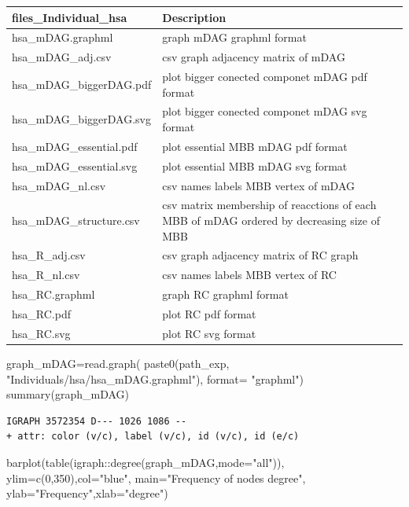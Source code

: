 \documentclass[
  letterpaper,
  DIV=11,
  numbers=noendperiod]{scrreprt}
\newenvironment{Shaded}{}{}
\newcommand{\AttributeTok}[1]{\textcolor[rgb]{0.78,0.47,0.87}{#1}}
\newcommand{\DecValTok}[1]{\textcolor[rgb]{0.82,0.60,0.40}{#1}}
\newcommand{\FunctionTok}[1]{\textcolor[rgb]{0.38,0.69,0.94}{#1}}
\newcommand{\NormalTok}[1]{\textcolor[rgb]{0.67,0.70,0.75}{#1}}
\newcommand{\OtherTok}[1]{\textcolor[rgb]{0.15,0.68,0.38}{#1}}
\newcommand{\SpecialCharTok}[1]{\textcolor[rgb]{0.34,0.71,0.76}{#1}}
\newcommand{\StringTok}[1]{\textcolor[rgb]{0.60,0.76,0.47}{#1}}
\begin{document}
\begin{tabular}{l|l}
\hline
files\_Individual\_hsa & Description\\
\hline
hsa\_mDAG.graphml & graph mDAG graphml format\\
\hline
hsa\_mDAG\_adj.csv & csv graph adjacency matrix of mDAG\\
\hline
hsa\_mDAG\_biggerDAG.pdf & plot bigger conected componet mDAG pdf format\\
\hline
hsa\_mDAG\_biggerDAG.svg & plot bigger conected componet mDAG svg format\\
\hline
hsa\_mDAG\_essential.pdf & plot essential MBB mDAG pdf format\\
\hline
hsa\_mDAG\_essential.svg & plot essential MBB mDAG svg format\\
\hline
hsa\_mDAG\_nl.csv & csv names labels MBB vertex of mDAG\\
\hline
hsa\_mDAG\_structure.csv & csv matrix membership of reacctions of each MBB of mDAG ordered by decreasing size of MBB\\
\hline
hsa\_R\_adj.csv & csv graph adjacency matrix of RC graph\\
\hline
hsa\_R\_nl.csv & csv names labels MBB vertex of RC\\
\hline
hsa\_RC.graphml & graph RC graphml format\\
\hline
hsa\_RC.pdf & plot RC pdf format\\
\hline
hsa\_RC.svg & plot RC svg format\\
\hline
\end{tabular}

\begin{Shaded}
\begin{Highlighting}[]
\NormalTok{graph\_mDAG}\OtherTok{=}\FunctionTok{read.graph}\NormalTok{(}
  \FunctionTok{paste0}\NormalTok{(path\_exp,}
         \StringTok{"Individuals/hsa/hsa\_mDAG.graphml"}\NormalTok{),}
  \AttributeTok{format=} \StringTok{"graphml"}\NormalTok{)}
\FunctionTok{summary}\NormalTok{(graph\_mDAG)}
\end{Highlighting}
\end{Shaded}

\begin{verbatim}
IGRAPH 3572354 D--- 1026 1086 -- 
+ attr: color (v/c), label (v/c), id (v/c), id (e/c)
\end{verbatim}

\begin{Shaded}
\begin{Highlighting}[]
\FunctionTok{barplot}\NormalTok{(}\FunctionTok{table}\NormalTok{(igraph}\SpecialCharTok{::}\FunctionTok{degree}\NormalTok{(graph\_mDAG,}\AttributeTok{mode=}\StringTok{"all"}\NormalTok{)),}
              \AttributeTok{ylim=}\FunctionTok{c}\NormalTok{(}\DecValTok{0}\NormalTok{,}\DecValTok{350}\NormalTok{),}\AttributeTok{col=}\StringTok{"blue"}\NormalTok{,}
              \AttributeTok{main=}\StringTok{"Frequency of nodes degree"}\NormalTok{,}
              \AttributeTok{ylab=}\StringTok{"Frequency"}\NormalTok{,}\AttributeTok{xlab=}\StringTok{"degree"}\NormalTok{)}
\end{Highlighting}
\end{Shaded}
\end{document}
